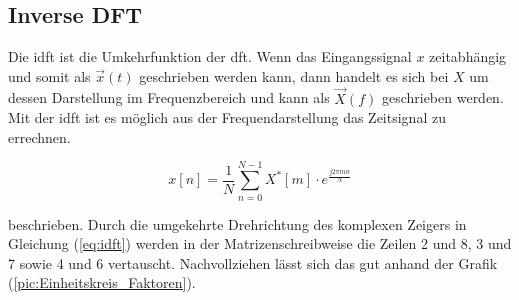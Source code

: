 \subsection{Inverse DFT}

Die \gls{idft} ist die Umkehrfunktion der \gls{dft}. Wenn das Eingangssignal $x$ zeitabhängig und somit als $\vec{x}(t)$ geschrieben werden kann, dann handelt es sich bei $X$ um
dessen Darstellung im Frequenzbereich und kann als $\vec{X}(f)$ geschrieben werden. Mit der \gls{idft} ist es möglich aus der Frequendarstellung das Zeitsignal zu errechnen.

\begin{equation}\label{eq:idft}
 x \left[ n \right] = \frac{1}{N} \sum^{N-1}_{n=0} X^*[m] \cdot e^{\frac{j 2 \pi m n}{N}}
\end{equation}

beschrieben. Durch die umgekehrte Drehrichtung des komplexen Zeigers in Gleichung (\ref{eq:idft}) werden in der Matrizenschreibweise die Zeilen 2 und 8, 3 und 7 sowie 4 und 6 vertauscht.
Nachvollziehen lässt sich das gut anhand der Grafik (\ref{pic:Einheitskreis_Faktoren}). 

